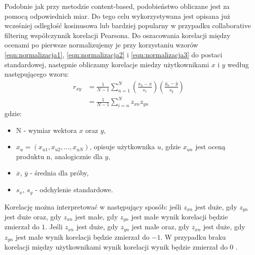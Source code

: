 Podobnie jak przy metodzie content-based, podobieństwo obliczane jest za pomocą odpowiednich miar. Do tego celu wykorzystywana jest opisana już wcześniej odległość kosinusowa lub bardziej popularny w przypadku collaborative filtering współczynnik korelacji Pearsona. Do oszacowania korelacji między ocenami po pierwsze normalizujemy je przy korzystaniu wzorów \eqref{eqn:normalizacja1}, \eqref{eqn:normalizacja2} i \eqref{eqn:normalizacja3} do postaci standardowej, następnie obliczamy korelacje miedzy użytkownikami $x$ i $y$ według następującego wzoru:
\begin{equation}
\begin{aligned}
        r_{xy} & =\frac{1}{N-1} \sum ^N _{n=1} \left( \frac{x_n - \bar{x}}{s_x} \right) \left( \frac{y_n - \bar{y}}{s_y} \right) \\
        & = \frac{1}{N-1} \sum ^N _{i=n} z_{xn} z_{yn}
\end{aligned}
\end{equation}
gdzie:
\begin{itemize}
    \item N - wymiar wektora $x$ oraz $y$,
    \item $x_u = (x_{u1}, x_{u2}, ... , x_{uN})$, opisuje użytkownika $u$, gdzie $x_{un}$ jest oceną produktu n, analogicznie dla $y$,
    \item $\overline{x}$, $\overline{y}$ - średnia dla próby,
    \item $s_x$, $s_y$ - odchylenie standardowe.
\end{itemize}

Korelację można interpretować w następujący sposób: jeśli $z_{xn}$ jest duże, gdy $z_{yn}$ jest duże oraz, gdy $z_{xn}$ jest małe, gdy $z_{yn}$ jest małe wynik korelacji będzie zmierzał do $1$. Jeśli  $z_{xn}$ jest duże, gdy $z_{yn}$ jest małe oraz, gdy $z_{xn}$ jest duże, gdy $z_{yn}$ jest małe wynik korelacji będzie zmierzał do $-1$. W przypadku braku korelacji między użytkownikami wynik korelacji wynik będzie zmierzał do $0$ \cite{Similarityandrecommendersystems}.


